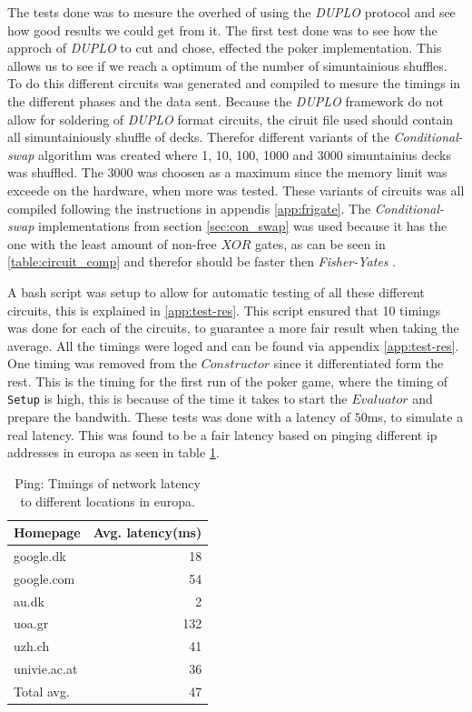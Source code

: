 \documentclass[twoside,11pt,openright]{report}
\newcommand{\FY}{\textit{Fisher-Yates} }
\newcommand{\CS}{\textit{Conditional-swap} }
\newcommand{\DUPLO}{\textit{DUPLO} }
\begin{document}
The tests done was to mesure the overhed of using the \DUPLO protocol and see how good results we could get from it. The first test done was to see how the approch of \DUPLO to cut and chose, effected the poker implementation. This allows us to see if we reach a optimum of the number of simuntainious shuffles. To do this different circuits was generated and compiled to mesure the timings in the different phases and the data sent. Because the \DUPLO framework do not allow for soldering of \DUPLO format circuits, the ciruit file used should contain all simuntainiously shuffle of decks. Therefor different variants of the \CS algorithm was created where 1, 10, 100, 1000 and 3000 simuntainius decks was shuffled. The 3000 was choosen as a maximum since the memory limit was exceede on the hardware, when more was tested. These variants of circuits was all compiled following the instructions in appendis \ref{app:frigate}. The \CS implementations from section \ref{sec:con_swap} was used because it has the one with the least amount of non-free $XOR$ gates, as can be seen in \ref{table:circuit_comp} and therefor should be faster then \FY.

A bash script was setup to allow for automatic testing of all these different circuits, this is explained in \ref{app:test-res}. This script ensured that 10 timings was done for each of the circuits, to guarantee a more fair result when taking the average. All the timings were loged and can be found via appendix \ref{app:test-res}. One timing was removed from the $Constructor$ since it differentiated form the rest. This is the timing for the first run of the poker game, where the timing of \verb|Setup| is high, this is because of the time it takes to start the $Evaluator$ and prepare the bandwith. These tests was done with a latency of $50$ms, to simulate a real latency. This was found to be a fair latency based on pinging different ip addresses in europa as seen in table \ref{table:ping}. 

\begin{table}[t]
\centering
\begin{tabular}{l || r}
Homepage & Avg. latency(ms)    \\
\hline
google.dk    &  18    \\
google.com   &  54    \\
au.dk        &   2    \\
uoa.gr       & 132    \\
uzh.ch       &  41    \\
univie.ac.at &  36    \\
\hline
Total avg.   &  47
\end{tabular}
\caption{Ping: Timings of network latency to different locations in europa.}
\label{table:ping}
\end{table}
\end{document}
